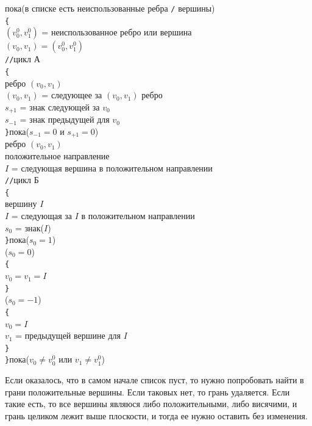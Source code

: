\documentclass[a4paper,12pt, titlepage]{article}
\begin{document}
	\begin{flushleft}
		пока(в списке есть неиспользованные ребра \verb"/" вершины)\\
		\verb"{"\\
		\quad$(v_{0}^{0}, v_{1}^{0})$ = неиспользованное ребро или вершина\\
		\quad$(v_{0}, v_{1}) = (v_{0}^{0}, v_{1}^{0})$\\
		\quad\verb"//"цикл А\\
		\quad\verb"{"\\
		\quad{} ребро $(v_{0}, v_{1})$\\
		\quad\quad$(v_{0}, v_{1})$ = следующее за $(v_{0}, v_{1})$ ребро\\
		\quad\quad$s_{+1}$ = знак следующей за $v_{0}$\\
		\quad\quad$s_{-1}$ = знак предыдущей для $v_{0}$\\
		\quad\verb"}"пока($s_{-1} = 0$ и $s_{+1} = 0$)\\
		 ребро $(v_{0}, v_{1})$\\
		 положительное направление\\
		\quad$I$ = следующая вершина в положительном направлении\\
		\quad\verb"//"цикл Б\\
		\quad\verb"{"\\
		\quad{} вершину $I$\\
		\quad\quad$I$ = следующая за $I$ в положительном направлении\\
		\quad\quad$s_{0}$ = знак($I$)\\
		\quad\verb"}"пока($s_{0} = 1$)\\
		($s_{0} = 0$)\\
		\quad\verb"{"\\
		\quad\quad$v_{0} = v_{1} = I$\\
		\quad\verb"}"\\
		($s_{0} = -1$)\\
		\quad\verb"{"\\
		\quad\quad$v_{0} = I$\\
		\quad\quad$v_{1}$ = предыдущей вершине для $I$\\
		\quad\verb"}"\\		
		\verb"}"пока($v_{0} \ne v_{0}^{0}$ или $v_{1} \ne v_{1}^{0}$)\\		
	\end{flushleft}
	
	\begin{flushleft}
		Если оказалось, что в самом начале список пуст, то нужно попробовать найти в грани
		положительные вершины. Если таковых нет, то грань удаляется. Если такие есть, то все
		вершины являюся либо положительными, либо висячими, и грань целиком лежит выше плоскости,
		и тогда ее нужно оставить без изменения.
	\end{flushleft}
	
\end{document}
